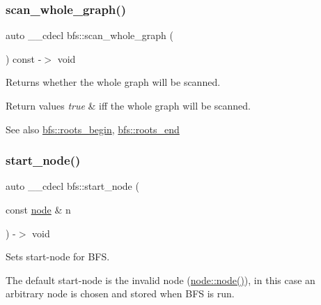 \subsubsection{\texorpdfstring{scan\+\_\+whole\+\_\+graph()}{scan\_whole\_graph()}\hspace{0.1cm}{\footnotesize\ttfamily [2/2]}}
{\footnotesize\ttfamily auto \+\_\+\+\_\+cdecl bfs\+::scan\+\_\+whole\+\_\+graph (\begin{DoxyParamCaption}{ }\end{DoxyParamCaption}) const -\/$>$ void \hspace{0.3cm}{\ttfamily [inline]}}



Returns whether the whole graph will be scanned. 


\begin{DoxyRetVals}{Return values}
{\em true} & iff the whole graph will be scanned. \\
\hline
\end{DoxyRetVals}
\begin{DoxySeeAlso}{See also}
\mbox{\hyperlink{classbfs_a8ba1e13916302d68faafc5c5098b04fe}{bfs\+::roots\+\_\+begin}}, \mbox{\hyperlink{classbfs_ab120a4a529a9cbf407e5dcba8d33598e}{bfs\+::roots\+\_\+end}} 
\end{DoxySeeAlso}
\mbox{\label{classbfs_aecb495d5cc06f8a0f89239d70668abba}} 
\subsubsection{\texorpdfstring{start\+\_\+node()}{start\_node()}\hspace{0.1cm}{\footnotesize\ttfamily [1/2]}}
{\footnotesize\ttfamily auto \+\_\+\+\_\+cdecl bfs\+::start\+\_\+node (\begin{DoxyParamCaption}\item[{const \mbox{\hyperlink{classnode}{node}} \&}]{n }\end{DoxyParamCaption}) -\/$>$ void \hspace{0.3cm}{\ttfamily [inline]}}



Sets start-\/node for B\+FS. 

The default start-\/node is the invalid node (\mbox{\hyperlink{classnode_ad603259398d5667e3b97a6322a2bcc20}{node\+::node()}}), in this case an arbitrary node is chosen and stored when B\+FS is run.


